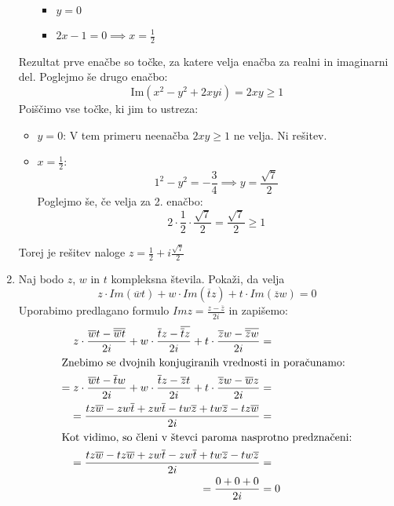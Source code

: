 \documentclass[12pt,a4paper,slovene]{article}
\begin{document}
\begin{enumerate}[(1)]
\begin{itemize}
        \begin{itemize}
            \item $y = 0$
            \item $2x  - 1 = 0 \implies x = \frac{1}{2}$
        \end{itemize}
    \end{itemize}
    Rezultat prve enačbe so točke, za katere velja enačba za realni in imaginarni del. Poglejmo še drugo enačbo:
    \[
    \text{Im}(x^2 - y^2 + 2xyi) = 2xy \geq 1
    \]
    Poiščimo vse točke, ki jim to ustreza:
    \begin{itemize}
        \item $y = 0$: V tem primeru neenačba $2xy \geq 1$ ne velja. Ni rešitev.
        \item $x = \frac{1}{2}$:
        \[
        1^2 - y^2 = -\frac{3}{4} \implies y = \frac{\sqrt{7}}{2}
        \]
        Poglejmo še, če velja za 2. enačbo:
        \[
        2 \cdot \frac{1}{2} \cdot \frac{\sqrt{7}}{2} = \frac{\sqrt{7}}{2} \geq 1
        \]
    \end{itemize}
    Torej je rešitev naloge $z = \frac{1}{2} + i \frac{\sqrt{7}}{2} $

\item
Naj bodo $z$, $w$ in $t$ kompleksna števila. Pokaži, da velja 
	\[
    	z\cdot Im(\overline{w}t) + w\cdot Im(\overline{t}z) + t\cdot Im(\overline{z}w) = 0
    \]
    Uporabimo predlagano formulo $Im z = \frac{z-\overline{z}}{2i}$ in zapišemo:
    \begin{align*}
    	z\cdot\frac{\overline{w}t - \overline{\overline{w}t}}{2i} + w\cdot\frac{\overline{t}z - 	\overline{\overline{t}z}}{2i} + t\cdot\frac{\overline{z}w - \overline{\overline{z}w}}{2i} &=  \\
        \intertext{Znebimo se dvojnih konjugiranih vrednosti in poračunamo:}
        =z\cdot\frac{\overline{w}t - \overline{t}w}{2i} + w\cdot\frac{\overline{t}z - \overline{z}t}{2i} + t\cdot\frac{\overline{z}w - \overline{w}z}{2i} &=  \\
        =\frac{tz\overline{w} - zw\overline{t} + zw\overline{t} - tw\overline{z} + tw\overline{z} - tz\overline{w}}{2i} &=  \\
        \intertext{Kot vidimo, so členi v števci paroma nasprotno predznačeni:}
        =\frac{tz\overline{w} - tz\overline{w} + zw\overline{t} - zw\overline{t} + tw\overline{z} - tw\overline{z}}{2i} &=  \\
        =\frac{0+0+0}{2i} &= 0
    \end{align*}
\end{enumerate}
\end{document}
